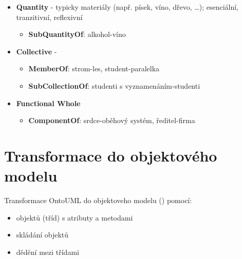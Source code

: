 \documentclass{szzclass}
\begin{document}
\begin{itemize}
\item \textbf{Quantity} - typicky materiály (např. písek, víno, dřevo, \dots); esenciální, tranzitivní, reflexivní
  \begin{itemize}
  \item \textbf{SubQuantityOf}: alkohol-víno
  \end{itemize}
\item \textbf{Collective} - 
  \begin{itemize}
  \item \textbf{MemberOf}: strom-les, student-paralelka
  \item \textbf{SubCollectionOf}: studenti s vyznamenáním-studenti
  \end{itemize}
\item \textbf{Functional Whole}
  \begin{itemize}
  \item \textbf{ComponentOf}: srdce-oběhový systém, ředitel-firma
  \end{itemize}
\end{itemize}


\section{Transformace do objektového modelu}
Transformace OntoUML do objektoveho modelu () pomocí:
\begin{itemize}
\item objektů (tříd) s atributy a metodami
\item skládání objektů
\item dědění mezi třídami
\end{itemize}
\end{document}
